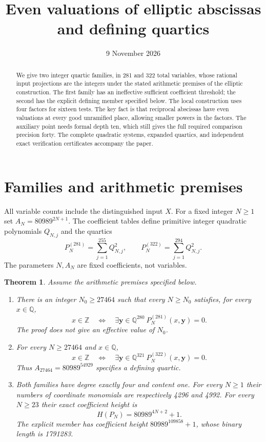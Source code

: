 \documentclass[11pt,a4paper]{article}
\title{Even valuations of elliptic abscissas and defining quartics}
\author{}\date{9 November 2026}
\newtheorem{theorem}{Theorem}[section]
\theoremstyle{remark}\newtheorem{remark}[theorem]{Remark}
\newcommand{\Q}{\mathbb Q}\newcommand{\Z}{\mathbb Z}\newcommand{\HH}{\mathcal H}
\begin{document}
\maketitle
\begin{abstract}
We give two integer quartic families, in 281 and 322 total variables,
whose rational input projections are the integers under the stated
arithmetic premises of the elliptic construction. The first family has
an ineffective sufficient coefficient threshold; the second has the
explicit defining member specified below. The local construction uses
four factors for sixteen tests. The key fact is that reciprocal
abscissas have even valuations at every good unramified place, allowing
smaller powers in the factors. The auxiliary point needs formal depth
ten, which still gives the full required comparison precision forty.
The complete quadratic systems, expanded quartics, and independent
exact verification certificates accompany the paper.
\end{abstract}

\section{Families and arithmetic premises}
All variable counts include the distinguished input $X$. For a fixed
integer $N\ge1$ set $A_N=80989^{2N+1}$. The coefficient tables define
primitive integer quadratic polynomials $Q_{N,j}$ and the quartics
\[
 P_N^{(281)}=\sum_{j=1}^{255}Q_{N,j}^2,
 \qquad P_N^{(322)}=\sum_{j=1}^{294}Q_{N,j}^2.
\]
The parameters $N,A_N$ are fixed coefficients, not variables.

\begin{theorem}\label{thm:families}
Assume the arithmetic premises specified below.
\begin{enumerate}
\item There is an integer $N_0\ge27464$ such that every $N\ge N_0$
 satisfies, for every $x\in\Q$,
\[
 x\in\Z\quad\Longleftrightarrow\quad
 \exists\mathbf y\in\Q^{280}\ P_N^{(281)}(x,\mathbf y)=0.
\]
 The proof does not give an effective value of $N_0$.
\item For every $N\ge27464$ and $x\in\Q$,
\[
 x\in\Z\quad\Longleftrightarrow\quad
 \exists\mathbf y\in\Q^{321}\ P_N^{(322)}(x,\mathbf y)=0.
\]
 Thus $A_{27464}=80989^{54929}$ specifies a defining quartic.
\item Both families have degree exactly four and content one.
 For every $N\ge1$ their numbers of coordinate monomials are respectively
4296 and 4992. For every $N\ge23$ their exact coefficient height is
\[
                H(P_N)=80989^{4N+2}+1.
\]
 The explicit member has coefficient height $80989^{109858}+1$,
 whose binary length is 1791283.
\end{enumerate}
\end{theorem}
\end{document}
